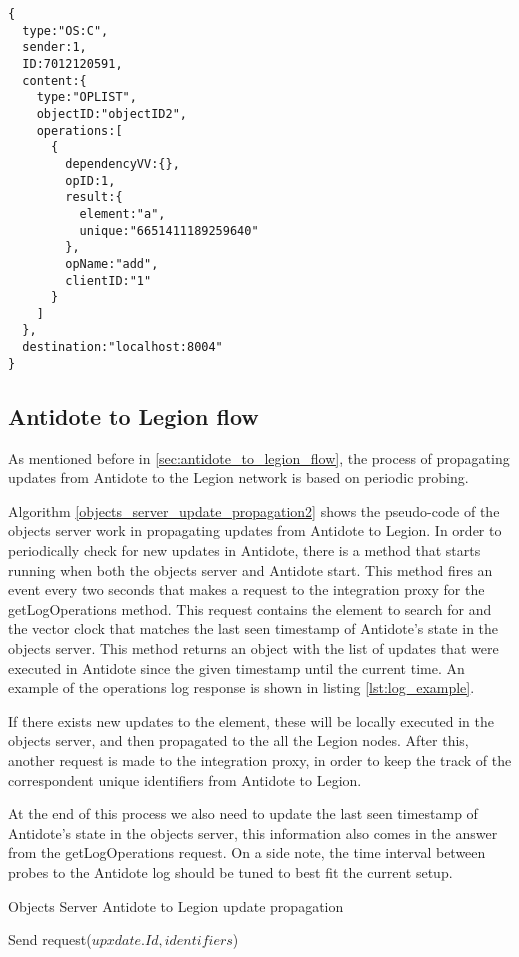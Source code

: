 \begin{lstlisting}[caption={Legion update content message example},label={lst:update_example}]
{
  type:"OS:C",
  sender:1,
  ID:7012120591,
  content:{
    type:"OPLIST",
    objectID:"objectID2",
    operations:[
      {
        dependencyVV:{},
        opID:1,
        result:{
          element:"a",
          unique:"6651411189259640"
        },
        opName:"add",
        clientID:"1"
      }
    ]
  },
  destination:"localhost:8004"
}
\end{lstlisting}

\subsection{Antidote to Legion flow}
\label{sec:legion_changes_antidote to legion flow}
As mentioned before in \ref{sec:antidote_to_legion_flow}, the process of propagating updates from Antidote to the Legion network is based on periodic probing.\par
	Algorithm \ref{objects_server_update_propagation2} shows the pseudo-code of the objects server work in propagating updates from Antidote to Legion. In order to periodically check for new updates in Antidote, there is a method that starts running when both the objects server and Antidote start. This method fires an event every two seconds that makes a request to the integration proxy for the getLogOperations method. This request contains the element to search for and the vector clock that matches the last seen timestamp of Antidote's state in the objects server. This method returns an object with the list of updates that were executed in Antidote since the given timestamp until the current time. An example of  the operations log response is shown in listing \ref{lst:log_example}.\par
	If there exists new updates to the element, these will be locally executed in the objects server, and then propagated to the all the Legion nodes. After this, another request is made to the integration proxy, in order to keep the track of the correspondent unique identifiers from Antidote to Legion.\par
	At the end of this process we also need to update the last seen timestamp of Antidote's state in the objects server, this information also comes in the answer from the getLogOperations request. On a side note, the time interval between probes to the Antidote log should be tuned to best fit the current setup.
	
\begin{algorithm}[H]
\caption{Objects Server Antidote to Legion update propagation}\label{objects_server_update_propagation2}
\begin{algorithmic}[1]
        \State Send request($upxdate.Id, identifiers$)
      \EndFor
\End
\end{algorithmic}
\end{algorithm}
	
